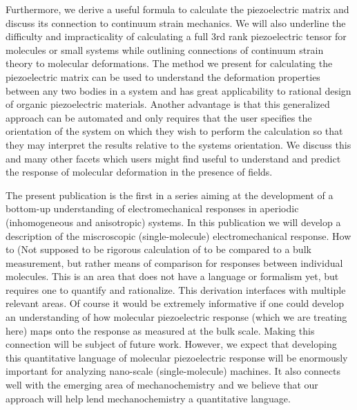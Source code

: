 Furthermore, we derive a useful formula to calculate the piezoelectric matrix and discuss its connection to continuum strain mechanics. 
We will also underline the difficulty and impracticality of calculating a full 3rd rank piezoelectric tensor for molecules or small systems
while outlining connections of continuum strain theory to molecular deformations.  
The method we present for calculating the piezoelectric matrix can be used to understand the deformation properties between any two bodies in a system
and has great applicability to rational design of organic piezoelectric materials.
Another advantage is that this generalized approach can be automated and only requires that the user specifies the orientation of the 
system on which they wish to perform the calculation so that they may interpret the results relative to the systems orientation.
We discuss this and many other facets which users might find useful to understand and predict the response of molecular deformation in the presence
of fields.



The present publication is the first in a series aiming at the development of a bottom-up understanding of
electromechanical responses in aperiodic (inhomogeneous and anisotropic) systems. 
In this publication we will develop a description of the miscroscopic (single-molecule) electromechanical response. How to  
(Not supposed to be rigorous calculation of \dd{} to be compared to a bulk
measurement, but rather means of comparison for responses between individual
molecules. This is an area that does not have a language or formalism yet, but
requires one to quantify and rationalize. This derivation interfaces with
multiple relevant areas. 
Of course it would be extremely informative if one
could develop an understanding of how molecular piezoelectric response (which
we are treating here) maps onto the response as measured at the bulk scale.
Making this connection will be subject of future work. However, we expect that
developing this quantitative language of molecular piezoelectric response will
be enormously important for analyzing nano-scale (single-molecule) machines. It also 
connects well with the emerging area of mechanochemistry and we believe that
our approach will help lend mechanochemistry a quantitative language. 


